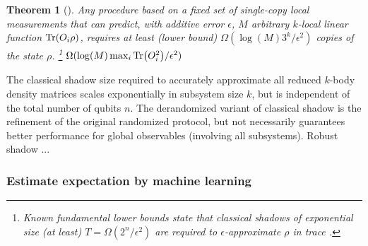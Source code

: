 \documentclass[
reprint,
aps,
pra,
floatfix,
]{revtex4-2}
\theoremstyle{plain}
\newtheorem{theorem}{Theorem}
\theoremstyle{definition}
\newcommand{\ob}{O}
\newcommand{\dm}{\rho}
\newcommand{\ghz}{\text{GHZ}}
\begin{document}
\begin{theorem}[\cite{huangPredictingManyProperties2020}]\label{thm:classical_shadow}
	Any procedure based on a fixed set of single-copy local measurements that can predict,
	with additive error $\epsilon$, $M$ arbitrary $k$-local linear function $\Tr(\ob_i\dm)$,
	requires at least (lower bound)
	$\Omega(\log(M) 3^k/\epsilon^2)$ copies of the state $\dm$.
	\footnote{Known fundamental lower bounds state that classical shadows of exponential size (at least) $T = \Omega( 2^n / \epsilon^2)$ are required to $\epsilon$-approximate $\dm$ in trace .}
	$\Omega(\log(M) \max_i\Tr(\ob_i^2)/\epsilon^2)$ 
\end{theorem}


The classical shadow size required to accurately approximate all reduced $k$-body density matrices scales exponentially in subsystem size $k$, but is independent of the total number of qubits $n$.
The derandomized variant of classical shadow \cite{huangEfficientEstimationPauli2021} is the refinement of the original randomized protocol, 
but not necessarily guarantees better performance for global observables (involving all subsystems).  
Robust shadow \cite{chenRobustShadowEstimation2021} ...

\subsubsection{Estimate expectation by machine learning}

\end{document}
